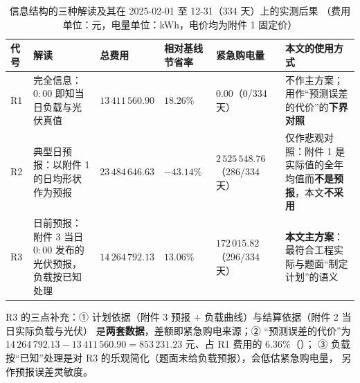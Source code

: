 \begin{table}[htbp]
  \centering
  \caption{信息结构的三种解读及其在 2025-02-01 至 12-31（334 天）上的实测后果
           （费用单位：元，电量单位：kWh，电价均为附件 1 固定价）}
  \label{tab:infostruct}
  \footnotesize
  \setlength{\tabcolsep}{3pt}
  \begin{tabularx}{\linewidth}{C{0.7cm} L{2.95cm} C{2.25cm} C{1.35cm} C{2.15cm} Y}
    \toprule
    代号 & 解读 & 总费用 & 相对基线节省率 & 紧急购电量 & 本文的使用方式 \\
    \midrule
    R1 & 完全信息：\(0{:}00\) 即知当日负载与光伏真值
      & \(13\,411\,560.90\) & \(18.26\%\) & \(0.00\)（0/334 天）
      & 不作主方案；用作“预测误差的代价”的\textbf{下界对照} \\
    R2 & 典型日预报：以附件 1 的日均形状作为预报
      & \(23\,484\,646.63\) & \(-43.14\%\) & \(2\,525\,548.76\)（286/334 天）
      & 仅作悲观对照：附件 1 是实际值的全年均值而\textbf{不是预报}，本文\textbf{不采用} \\
    R3 & 日前预报：附件 3 当日 \(0{:}00\) 发布的光伏预报，负载按已知处理
      & \(14\,264\,792.13\) & \(13.06\%\) & \(172\,015.82\)（296/334 天）
      & \textbf{本文主方案}：最符合工程实际与题面“制定计划”的语义 \\
    \bottomrule
  \end{tabularx}
\end{table}

R3 的三点补充：① 计划依据（附件 3 预报 \(+\) 负载曲线）与结算依据（附件 2 当日实际负载与光伏）
是\textbf{两套数据}，差额即紧急购电来源；② “预测误差的代价”为
\(14\,264\,792.13-13\,411\,560.90=853\,231.23\) 元、占 R1 费用的 \(6.36\%\)（）；
③ 负载按“已知”处理是对 R3 的乐观简化（题面未给负载预报），会低估紧急购电量，
另作预报误差灵敏度。
